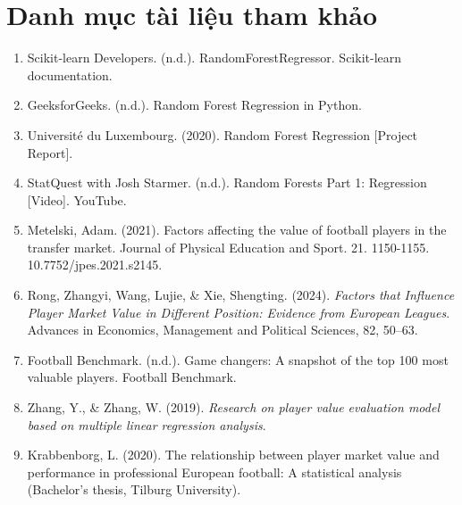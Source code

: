 \documentclass[12pt]{report}
\begin{document}
\chapter*{Danh mục tài liệu tham khảo}
{
\begin{enumerate}
    \item Scikit-learn Developers. (n.d.). RandomForestRegressor. Scikit-learn documentation.
    \item GeeksforGeeks. (n.d.). Random Forest Regression in Python.
    \item Université du Luxembourg. (2020). Random Forest Regression [Project Report].
    \item StatQuest with Josh Starmer. (n.d.). Random Forests Part 1: Regression [Video]. YouTube.
    \item Metelski, Adam. (2021). Factors affecting the value of football players in the transfer market. Journal of Physical Education and Sport. 21. 1150-1155. 10.7752/jpes.2021.s2145. 
    \item Rong, Zhangyi, Wang, Lujie, \& Xie, Shengting. (2024). \textit{Factors that Influence Player Market Value in Different Position: Evidence from European Leagues}. Advances in Economics, Management and Political Sciences, 82, 50--63.
    \item Football Benchmark. (n.d.). Game changers: A snapshot of the top 100 most valuable players. Football Benchmark.
    \item Zhang, Y., \& Zhang, W. (2019). \textit{Research on player value evaluation model based on multiple linear regression analysis}.
    \item Krabbenborg, L. (2020). The relationship between player market value and performance in professional European football: A statistical analysis (Bachelor's thesis, Tilburg University).

\end{enumerate}
}
\end{document}
